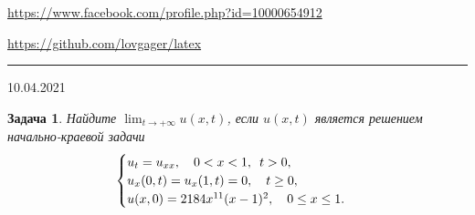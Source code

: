 \documentclass[12pt]{article}
\begin{document}


\begin{flushleft}
\url{https://www.facebook.com/profile.php?id=10000654912}

\url{https://github.com/lovgager/latex}
\end{flushleft}
\hrule 
\begin{flushright}
10.04.2021
\end{flushright}
\bigskip


\newtheorem*{task}{Задача}
\begin{task}
Найдите $\displaystyle\lim_{t\to +\infty} u(x,t)$, если $u(x,t)$ является решением начально-краевой задачи
\begin{equation*}
    \begin{cases}
        u_t = u_{xx}, \quad 0 < x < 1, \enskip t > 0,\\
        u_x(0,t) = u_x(1,t) = 0, \quad t \geq 0,\\
        u(x,0) = 2184x^{11}(x-1)^2, \quad 0 \leq x \leq 1.
    \end{cases}
\end{equation*}
\end{task}
\end{document}
